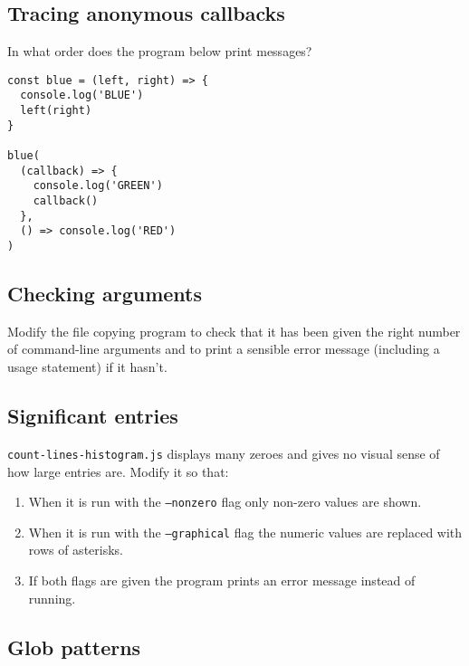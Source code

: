 \documentclass[krantzl]{krantz}
\begin{document}
\subsection*{Tracing anonymous callbacks}


In what order does the program below print messages?


\begin{lstlisting}[frame=single,frameround=tttt]
const blue = (left, right) => {
  console.log('BLUE')
  left(right)
}

blue(
  (callback) => {
    console.log('GREEN')
    callback()
  },
  () => console.log('RED')
)
\end{lstlisting}


\subsection*{Checking arguments}


Modify the file copying program to check that it has been given the right number of command-line arguments
and to print a sensible error message (including a usage statement) if it hasn't.

\subsection*{Significant entries}


\texttt{count-lines-histogram.js} displays many zeroes and gives no visual sense of how large entries are.
Modify it so that:

\begin{enumerate}

\item 

When it is run with the \texttt{--nonzero} flag only non-zero values are shown.



\item 

When it is run with the \texttt{--graphical} flag the numeric values are replaced with rows of asterisks.



\item 

If both flags are given the program prints an error message instead of running.



\end{enumerate}

\subsection*{Glob patterns}
\end{document}
